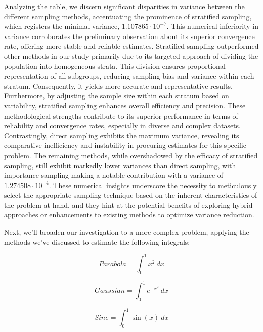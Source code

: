 \documentclass{article}
\begin{document}
Analyzing the table, we discern significant disparities in variance between the different sampling methods, accentuating the prominence of stratified sampling, which registers the minimal variance, \(1.107865 \cdot 10^{-7}\). This numerical inferiority in variance corroborates the preliminary observation about its superior convergence rate, offering more stable and reliable estimates. Stratified sampling outperformed other methods in our study primarily due to its targeted approach of dividing the population into homogeneous strata. This division ensures proportional representation of all subgroups, reducing sampling bias and variance within each stratum. Consequently, it yields more accurate and representative results. Furthermore, by adjusting the sample size within each stratum based on variability, stratified sampling enhances overall efficiency and precision. These methodological strengths contribute to its superior performance in terms of reliability and convergence rates, especially in diverse and complex datasets. Contrastingly, direct sampling exhibits the maximum variance, revealing its comparative inefficiency and instability in procuring estimates for this specific problem. The remaining methods, while overshadowed by the efficacy of stratified sampling, still exhibit markedly lower variances than direct sampling, with importance sampling making a notable contribution with a variance of \(1.274508 \cdot 10^{-4}\). These numerical insights underscore the necessity to meticulously select the appropriate sampling technique based on the inherent characteristics of the problem at hand, and they hint at the potential benefits of exploring hybrid approaches or enhancements to existing methods to optimize variance reduction.

Next, we'll broaden our investigation to a more complex problem, applying the methods we’ve discussed to estimate the following integrals:

\begin{equation} 
	\label{eq:integralvariancereduction1} 
	Parabola = \int_{0}^{1} x^2 \ dx 
\end{equation}

\begin{equation} 
	\label{eq:integralvariancereduction2} 
	Gaussian = \int_{0}^{1} e^{-x^2} \ dx
\end{equation}

\begin{equation} 
	\label{eq:integralvariancereduction3} 
	Sine = \int_{0}^{1} \sin(x) \ dx
\end{equation}
\end{document}
